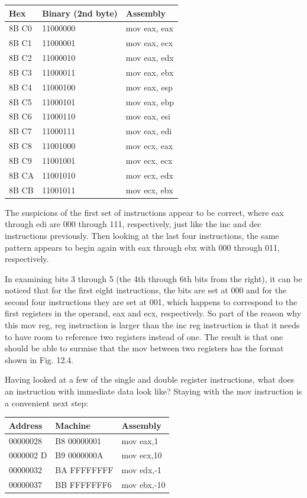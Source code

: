 \documentclass[10pt]{article}
\begin{document}
\begin{center}
\begin{tabular}{|l|l|l|}
\hline
Hex & Binary (2nd byte) & Assembly \\
\hline
8B C0 & 11000000 & mov eax, eax \\
\hline
8B C1 & 11000001 & mov eax, ecx \\
\hline
8B C2 & 11000010 & mov eax, edx \\
\hline
8B C3 & 11000011 & mov eax, ebx \\
\hline
8B C4 & 11000100 & mov eax, esp \\
\hline
8B C5 & 11000101 & mov eax, ebp \\
\hline
8B C6 & 11000110 & mov eax, esi \\
\hline
8B C7 & 11000111 & mov eax, edi \\
\hline
8B C8 & 11001000 & mov ecx, eax \\
\hline
8B C9 & 11001001 & mov ecx, ecx \\
\hline
8B CA & 11001010 & mov ecx, edx \\
\hline
8B CB & 11001011 & mov ecx, ebx \\
\hline
\end{tabular}
\end{center}

The suspicions of the first set of instructions appear to be correct, where eax through edi are 000 through 111, respectively, just like the inc and dec instructions previously. Then looking at the last four instructions, the same pattern appears to begin again with eax through ebx with 000 through 011, respectively.

In examining bits 3 through 5 (the 4th through 6th bits from the right), it can be noticed that for the first eight instructions, the bits are set at 000 and for the second four instructions they are set at 001, which happens to correspond to the first registers in the operand, eax and ecx, respectively. So part of the reason why this mov reg, reg instruction is larger than the inc reg instruction is that it needs to have room to reference two registers instead of one. The result is that one should be able to surmise that the mov between two registers has the format shown in Fig. 12.4.

Having looked at a few of the single and double register instructions, what does an instruction with immediate data look like? Staying with the mov instruction is a convenient next step:

\begin{center}
\begin{tabular}{|l|l|l|}
\hline
Address & Machine & Assembly \\
\hline
00000028 & B8 00000001 & mov eax,1 \\
\hline
0000002 D & B9 0000000A & mov ecx,10 \\
\hline
00000032 & BA FFFFFFFF & mov edx,-1 \\
\hline
00000037 & BB FFFFFFF6 & mov ebx,-10 \\
\hline
\end{tabular}
\end{center}
\end{document}
